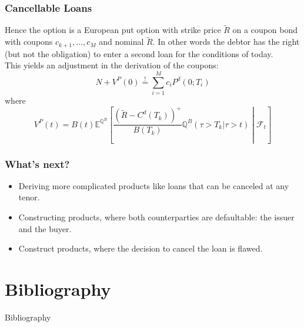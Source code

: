 \documentclass{beamer}
\newcommand{\mbeq}{\overset{!}{=}}
\begin{document}
	\begin{frame}
		\frametitle{Cancellable Loans}
		Hence the option is a European put option with strike price \(\tilde{R}\) on a coupon bond with coupons \(c_{k+1}, ..., c_{M}\) and nominal \(\tilde{R}\). In other words the debtor has the right (but not the obligation) to enter a second loan for the conditions of today.\\
		This yields an adjustment in the derivation of the coupons:
		\[N + V^P(0) \mbeq \sum_{i=1}^{M}c_i P^d(0;T_i)\]
		where \[V^P(t) = B(t)\mathbb{E}^{\mathbb{Q}^B}\left[\left.\frac{(\tilde{R} - C^d(T_k))^+}{B(T_k)} \mathbb{Q}^B(\tau > T_k | \tau > t)\; \right| \;\mathcal{F}_t\right]\]
		\end{frame}
	
	\begin{frame}
		\frametitle{What's next?}
		\begin{itemize}
			\item Deriving more complicated products like loans that can be canceled at any tenor.
			\item Constructing products, where both counterparties are defaultable: the issuer and the buyer.
			\item Construct products, where the decision to cancel the loan is flawed.
		\end{itemize}
	\end{frame}
	
	\section{Bibliography}
	
	\begin{frame}{Bibliography}
		\tiny
		
		
	\end{frame}
\end{document}
